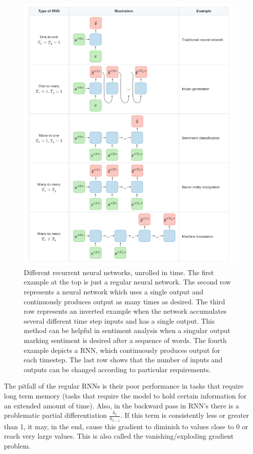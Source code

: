 \begin{figure}
  \centering
  \includegraphics[width=0.9\linewidth]{figures/chapter3/rnn_placeholder.png}
  \caption[recu]{Different recurrent neural networks, unrolled in time. The first example at the top is just a regular neural network. The second row represents a neural network which uses a single output and continuously produces output as many times as desired. The third row represents an inverted example when the network accumulates several different time step inputs and has a single output. This method can be helpful in sentiment analysis when a singular output marking sentiment is desired after a sequence of words.
  The fourth example depicts a RNN, which continuously produces output for each timestep. The last row shows that the number of inputs and outputs can be changed according to particular requirements\footnotemark. }
  \label{fig:recurrent_div}


\end{figure}


The pitfall of the regular RNNs is their poor performance in tasks that require long term memory (tasks that require the model to hold certain information for an extended amount of time).
Also, in the backward pass in RNN's there is a problematic partial differentiation $\frac{h_{t}}{h_{t-1}}$. If this term is consistently less or greater than 1, it may, in the end, cause this gradient to diminish to values close to 0 or reach very large values. This is also called the vanishing/exploding gradient problem.

